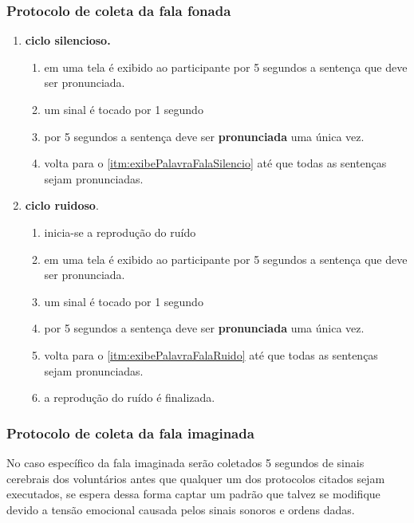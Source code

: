 				
		    \subsubsection{Protocolo de coleta da fala fonada}
			    \begin{enumerate}
			    	\item \textbf{ciclo silencioso.}
			    	\begin{enumerate}
			    		\item em uma tela é exibido ao participante por 5 segundos a sentença que deve ser pronunciada.\label{itm:exibePalavraFalaSilencio}
			    		\item um sinal é tocado por 1 segundo
			    		\item por 5 segundos a sentença deve ser \textbf{pronunciada} uma única vez.
			    		\item volta para o \autoref{itm:exibePalavraFalaSilencio} até que todas as sentenças sejam pronunciadas.
			    	\end{enumerate}
			    	
			    	\item \textbf{ciclo ruidoso}.
			    	\begin{enumerate}
			    		\item inicia-se a reprodução do ruído
			    		\item em uma tela é exibido ao participante por 5 segundos a sentença que deve ser pronunciada.\label{itm:exibePalavraFalaRuido}
			    		\item um sinal é tocado por 1 segundo
			    		\item por 5 segundos a sentença deve ser \textbf{pronunciada} uma única vez.
			    		\item volta para o \autoref{itm:exibePalavraFalaRuido} até que todas as sentenças sejam pronunciadas.
			    		\item a reprodução do ruído é finalizada.
			    	\end{enumerate}
			    \end{enumerate}
		    
		    \subsubsection{Protocolo de coleta da fala imaginada}
  			    \par No caso específico da fala imaginada serão coletados 5 segundos de sinais cerebrais dos voluntários antes que qualquer um dos protocolos citados sejam executados, se espera dessa forma captar um padrão que talvez se modifique devido a tensão emocional causada pelos sinais sonoros e ordens dadas. 
		    	
